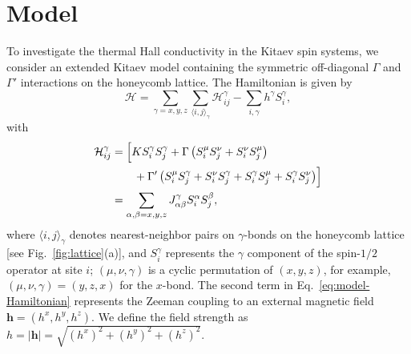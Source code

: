 \documentclass[twocolumn,superscriptaddress,showpacs, longbibliography, aps, prx]{revtex4-2}
\begin{document}
\section{Model}
\label{sec:model}
To investigate the thermal Hall conductivity in the Kitaev spin systems, we consider an extended Kitaev model containing the symmetric off-diagonal $\Gamma$ and $\Gamma'$ interactions on the honeycomb lattice. 
The Hamiltonian is given by
\begin{equation}
 \mathcal{H} = \sum_{\gamma = x,y,z} \sum_{\langle i,j \rangle_\gamma}\mathcal{H}_{ij}^\gamma -  \sum_{i,\gamma} h^\gamma S_i^\gamma,
 \label{eq:model-Hamiltonian}
\end{equation}
with
\begin{align}
 \mathcal{H}_{ij}^\gamma &= \Bigl[ K S_i^\gamma S_j^\gamma + \Gamma\left( S_i^\mu S_j^\nu + S_i^\nu S_j^\mu \right) \notag\\
&\qquad + \Gamma'\left( S_i^\mu S_j^\gamma + S_i^\nu S_j^\gamma + S_i^\gamma S_j^\mu + S_i^\gamma S_j^\nu \right) \Bigr]\\
&= \sum_{\alpha,\beta = x,y,z} J_{\alpha\beta}^\gamma S_i^\alpha S_j^\beta, 
\end{align}
where $\langle i,j\rangle_\gamma$ denotes nearest-neighbor pairs on $\gamma$-bonds on the honeycomb lattice [see Fig.~\ref{fig:lattice}(a)], and $S_i^\gamma$ represents the $\gamma$ component of the spin-$1/2$ operator at site $i$; $(\mu, \nu, \gamma)$ is a cyclic permutation of $(x,y,z)$, for example, $(\mu, \nu, \gamma)=(y,z,x)$ for the $x$-bond. 
The second term in Eq.~\eqref{eq:model-Hamiltonian} represents the Zeeman coupling to an external magnetic field $\bm{h} = (h^x, h^y, h^z)$. 
We define the field strength as $h = |\bm{h}| = \sqrt{(h^x)^2+(h^y)^2+(h^z)^2}$. 
\end{document}
